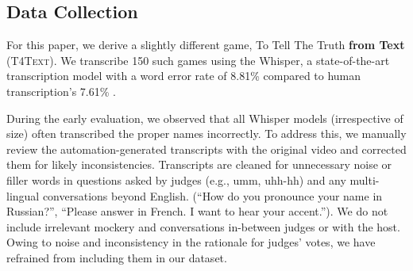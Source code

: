 


\subsection{Data Collection}
For this paper, we derive a slightly different game, To Tell The Truth \textbf{from Text} (\textsc{T4Text}). We transcribe 150 such games using the Whisper, a state-of-the-art transcription model with a word error rate of 8.81\% compared to human transcription's 7.61\% \cite{radford2023robust}.

During the early evaluation, we observed that all Whisper models (irrespective of size) often transcribed the proper names incorrectly. To address this, we manually review the automation-generated transcripts with the original video and corrected them for likely inconsistencies. Transcripts are cleaned for unnecessary noise or filler words in questions asked by judges (e.g., umm, uhh-hh) and any multi-lingual conversations beyond English. (``How do you pronounce your name in Russian?'', ``Please answer in French. I want to hear your accent.''). We do not include irrelevant mockery and conversations in-between judges or with the host. Owing to noise and inconsistency in the rationale for judges' votes, we have refrained from including them in our dataset.

